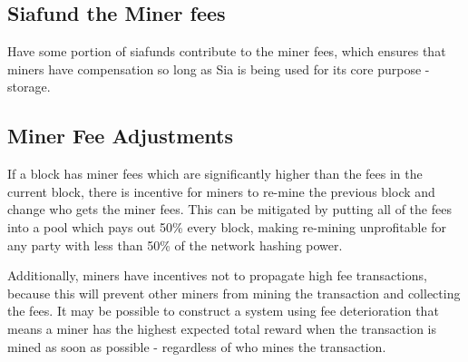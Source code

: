 \documentclass[twocolumn]{article}
\begin{document}



\subsection{Siafund the Miner fees}
Have some portion of siafunds contribute to the miner fees, which ensures that miners have compensation so long as Sia is being used for its core purpose - storage.

\subsection{Miner Fee Adjustments}
If a block has miner fees which are significantly higher than the fees in the current block, there is incentive for miners to re-mine the previous block and change who gets the miner fees.
This can be mitigated by putting all of the fees into a pool which pays out 50\% every block, making re-mining unprofitable for any party with less than 50\% of the network hashing power.

Additionally, miners have incentives not to propagate high fee transactions, because this will prevent other miners from mining the transaction and collecting the fees.
It may be possible to construct a system using fee deterioration that means a miner has the highest expected total reward when the transaction is mined as soon as possible - regardless of who mines the transaction.
\end{document}
